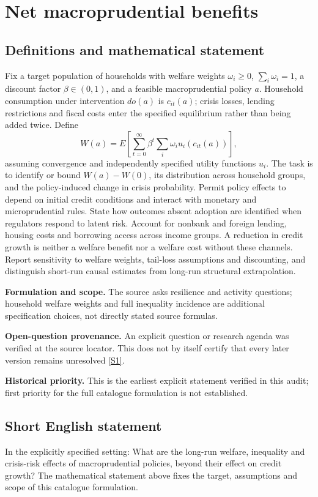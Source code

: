 \documentclass[11pt]{article}
\newcommand{\sref}[2]{\hyperlink{source:#1:#2}{[S#2]}}
\begin{document}
\section*{Net macroprudential benefits}\label{30007606}
\subsection{Definitions and mathematical statement}
Fix a target population of households with welfare weights \(\omega_i\geq0\), \(\sum_i\omega_i=1\), a discount factor \(\beta\in(0,1)\), and a feasible macroprudential policy \(a\). Household consumption under intervention \(do(a)\) is \(c_{it}(a)\); crisis losses, lending restrictions and fiscal costs enter the specified equilibrium rather than being added twice. Define
\[W(a)=E\left[\sum_{t=0}^{\infty}\beta^t\sum_i\omega_i u_i(c_{it}(a))\right],\]
assuming convergence and independently specified utility functions \(u_i\). The task is to identify or bound \(W(a)-W(0)\), its distribution across household groups, and the policy-induced change in crisis probability. Permit policy effects to depend on initial credit conditions and interact with monetary and microprudential rules. State how outcomes absent adoption are identified when regulators respond to latent risk. Account for nonbank and foreign lending, housing costs and borrowing access across income groups. A reduction in credit growth is neither a welfare benefit nor a welfare cost without these channels. Report sensitivity to welfare weights, tail-loss assumptions and discounting, and distinguish short-run causal estimates from long-run structural extrapolation.

\par\textbf{Formulation and scope.} The source asks resilience and activity questions; household welfare weights and full inequality incidence are additional specification choices, not directly stated source formulas.

\par\textbf{Open-question provenance.} An explicit question or research agenda was verified at the source locator. This does not by itself certify that every later version remains unresolved \sref{30007606}{1}.

\par\textbf{Historical priority.} This is the earliest explicit statement verified in this audit; first priority for the full catalogue formulation is not established.

\subsection{Short English statement}
In the explicitly specified setting: What are the long-run welfare, inequality and crisis-risk effects of macroprudential policies, beyond their effect on credit growth? The mathematical statement above fixes the target, assumptions and scope of this catalogue formulation.
\end{document}
